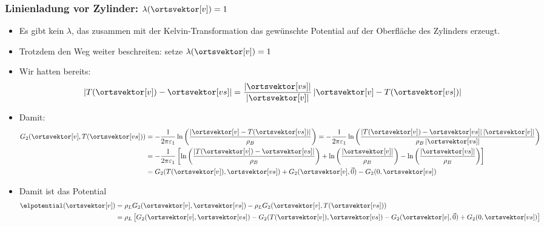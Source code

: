    \begin{frame}
\frametitle{Linienladung vor Zylinder: $\lambda(\ortsvektor[v])=1$}
\begin{itemize}[<+->]
\item Es gibt kein $\lambda$, das zusammen mit der Kelvin-Transformation das gewünschte Potential auf der Oberfläche des Zylinders erzeugt.
\item Trotzdem den Weg weiter beschreiten: setze $\lambda(\ortsvektor[v])=1$
\item Wir hatten bereits:
  \begin{equation*}
    \left| T(\ortsvektor[v]) - \ortsvektor[vs]  \right| = \frac{\left| \ortsvektor[vs]\right|}{\left| \ortsvektor[v]\right|} \left| \ortsvektor[v]   - T(\ortsvektor[vs]) \right|
  \end{equation*}
\item Damit:
  \begin{align*}
    G_2(\ortsvektor[v], T(\ortsvektor[vs])) & = -\frac{1}{2\pi\varepsilon_1} \ln\left(\frac{\left|\ortsvektor[v] - T(\ortsvektor[vs])\right|  }{\rho_B} \right)  = -\frac{1}{2\pi\varepsilon_1} \ln\left(\frac{\left|T(\ortsvektor[v]) - \ortsvektor[vs]\right|  \left| \ortsvektor[v]\right| }{\rho_B \left| \ortsvektor[vs]\right|} \right) \\
                                            &= -\frac{1}{2\pi\varepsilon_1} \left[ \ln\left(\frac{\left|T(\ortsvektor[v]) - \ortsvektor[vs]\right| }{\rho_B } \right) + \ln\left(\frac{ \left| \ortsvektor[v]\right| }{\rho_B } \right) - \ln\left(\frac{ \left| \ortsvektor[vs]\right| }{\rho_B } \right)  \right]\\
    &= G_2(T(\ortsvektor[v]), \ortsvektor[vs]) + G_2(\ortsvektor[v], \vec{0}) - G_2(0, \ortsvektor[vs])    
  \end{align*}
\item Damit ist das Potential
  \begin{align*}
    \elpotential(\ortsvektor[v]) & = \rho_L G_2(\ortsvektor[v], \ortsvektor[vs]) -\rho_L G_2(\ortsvektor[v], T(\ortsvektor[vs])) \\
    &= \rho_L \left[ G_2(\ortsvektor[v], \ortsvektor[vs]) - G_2(T(\ortsvektor[v]), \ortsvektor[vs]) - G_2(\ortsvektor[v], \vec{0}) + G_2(0, \ortsvektor[vs])\right]
    \end{align*}
  \end{itemize}
      \end{frame}

